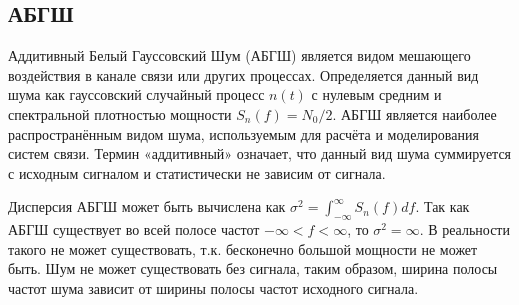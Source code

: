 \subsection{АБГШ}

Аддитивный Белый Гауссовский Шум (АБГШ) является видом мешающего воздействия в канале связи или других процессах. Определяется данный вид шума как гауссовский случайный процесс $n(t )$ с нулевым средним и спектральной плотностью мощности $S_n( f ) = N_0 / 2$. АБГШ является наиболее распространённым видом шума, используемым для расчёта и моделирования систем связи. Термин «аддитивный» означает, что данный вид шума суммируется с исходным сигналом и статистически не зависим от сигнала.

Дисперсия АБГШ может быть вычислена как $\sigma^2 = \int_{-\infty}^{\infty}S_n(f)df$. Так как АБГШ существует во всей полосе частот $-\infty < f < \infty$, то $\sigma^2 = \infty$. В реальности такого не может существовать, т.к. бесконечно большой мощности не может быть. Шум не может существовать без сигнала, таким образом, ширина полосы частот шума зависит от ширины полосы частот исходного сигнала. 